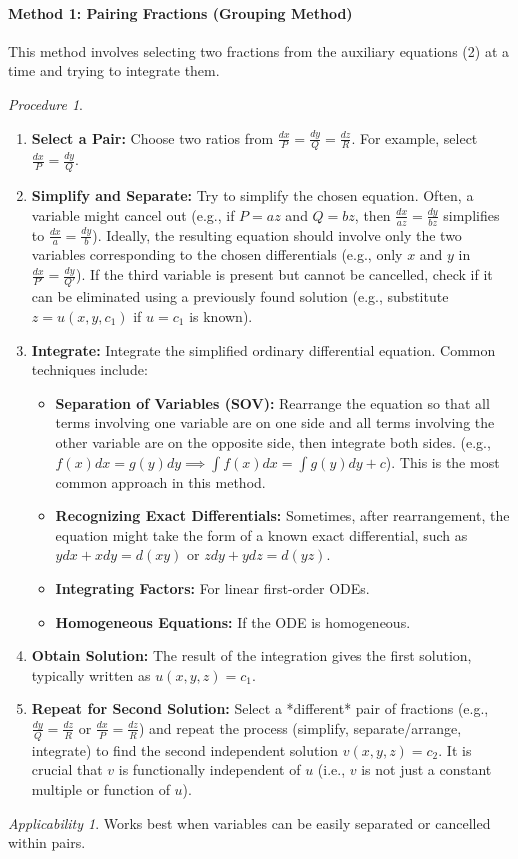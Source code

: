 \documentclass{article}
\theoremstyle{remark}
\newtheorem{procedure}{Procedure}[subsection] %
\newtheorem{applicability}{Applicability}[subsection] %
\begin{document}
	\paragraph{Method 1: Pairing Fractions (Grouping Method)}
	\label{lagrange:method:pairing}
	This method involves selecting two fractions from the auxiliary equations (2) at a time and trying to integrate them.
	\begin{procedure}
		\begin{enumerate}
			\item \textbf{Select a Pair:} Choose two ratios from $\frac{dx}{P} = \frac{dy}{Q} = \frac{dz}{R}$. For example, select $\frac{dx}{P} = \frac{dy}{Q}$.
			\item \textbf{Simplify and Separate:} Try to simplify the chosen equation. Often, a variable might cancel out (e.g., if $P=az$ and $Q=bz$, then $\frac{dx}{az} = \frac{dy}{bz}$ simplifies to $\frac{dx}{a} = \frac{dy}{b}$). Ideally, the resulting equation should involve only the two variables corresponding to the chosen differentials (e.g., only $x$ and $y$ in $\frac{dx}{P'} = \frac{dy}{Q'}$). If the third variable is present but cannot be cancelled, check if it can be eliminated using a previously found solution (e.g., substitute $z = u(x,y,c_1)$ if $u=c_1$ is known).
			\item \textbf{Integrate:} Integrate the simplified ordinary differential equation. Common techniques include:
			\begin{itemize}
				\item \textbf{Separation of Variables (SOV):} Rearrange the equation so that all terms involving one variable are on one side and all terms involving the other variable are on the opposite side, then integrate both sides. (e.g., $f(x)dx = g(y)dy \implies \int f(x)dx = \int g(y)dy + c$). This is the most common approach in this method.
				\item \textbf{Recognizing Exact Differentials:} Sometimes, after rearrangement, the equation might take the form of a known exact differential, such as $y dx + x dy = d(xy)$ or $z dy + y dz = d(yz)$.
				\item \textbf{Integrating Factors:} For linear first-order ODEs.
				\item \textbf{Homogeneous Equations:} If the ODE is homogeneous.
			\end{itemize}
			\item \textbf{Obtain Solution:} The result of the integration gives the first solution, typically written as $u(x, y, z) = c_1$.
			\item \textbf{Repeat for Second Solution:} Select a *different* pair of fractions (e.g., $\frac{dy}{Q} = \frac{dz}{R}$ or $\frac{dx}{P} = \frac{dz}{R}$) and repeat the process (simplify, separate/arrange, integrate) to find the second independent solution $v(x, y, z) = c_2$. It is crucial that $v$ is functionally independent of $u$ (i.e., $v$ is not just a constant multiple or function of $u$).
		\end{enumerate}
	\end{procedure}
	\begin{applicability}
		Works best when variables can be easily separated or cancelled within pairs.
	\end{applicability}
	
\end{document}
